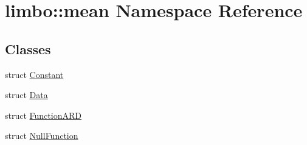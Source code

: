 \hypertarget{namespacelimbo_1_1mean}{}\section{limbo\+:\+:mean Namespace Reference}
\label{namespacelimbo_1_1mean}
\subsection*{Classes}
\begin{DoxyCompactItemize}
\item 
struct \hyperlink{structlimbo_1_1mean_1_1_constant}{Constant}
\item 
struct \hyperlink{structlimbo_1_1mean_1_1_data}{Data}
\item 
struct \hyperlink{structlimbo_1_1mean_1_1_function_a_r_d}{Function\+A\+R\+D}
\item 
struct \hyperlink{structlimbo_1_1mean_1_1_null_function}{Null\+Function}
\end{DoxyCompactItemize}
